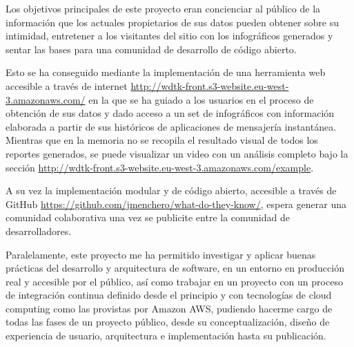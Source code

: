 
Los objetivos principales de este proyecto eran concienciar al público de la información que los actuales propietarios de sus datos pueden obtener sobre su intimidad, entretener a los visitantes del sitio con los infográficos generados y sentar las bases para una comunidad de desarrollo de código abierto.

Esto se ha conseguido mediante la implementación de una herramienta web accesible a través de internet \url{http://wdtk-front.s3-website.eu-west-3.amazonaws.com/}\cite{Plataforma} en la que se ha guiado a los usuarios en el proceso de obtención de sus datos y dado acceso a un set de infográficos con información elaborada a partir de sus históricos de aplicaciones de mensajería instantánea. Mientras que en la memoria no se recopila el resultado visual de todos los reportes generados, se puede visualizar un video con un análisis completo bajo la sección \url{http://wdtk-front.s3-website.eu-west-3.amazonaws.com/example}.

A su vez la implementación modular y de código abierto, accesible a través de GitHub \url{https://github.com/jmenchero/what-do-they-know/}\cite{Repositorio}, espera generar una comunidad colaborativa una vez se publicite entre la comunidad de desarrolladores.

Paralelamente, este proyecto me ha permitido investigar y aplicar buenas prácticas del desarrollo y arquitectura de software, en un entorno en producción real y accesible por el público, así como trabajar en un proyecto con un proceso de integración continua definido desde el principio y con tecnologías de cloud computing como las provistas por Amazon AWS, pudiendo hacerme cargo de todas las fases de un proyecto público, desde su conceptualización, diseño de experiencia de usuario, arquitectura e implementación hasta su publicación.
